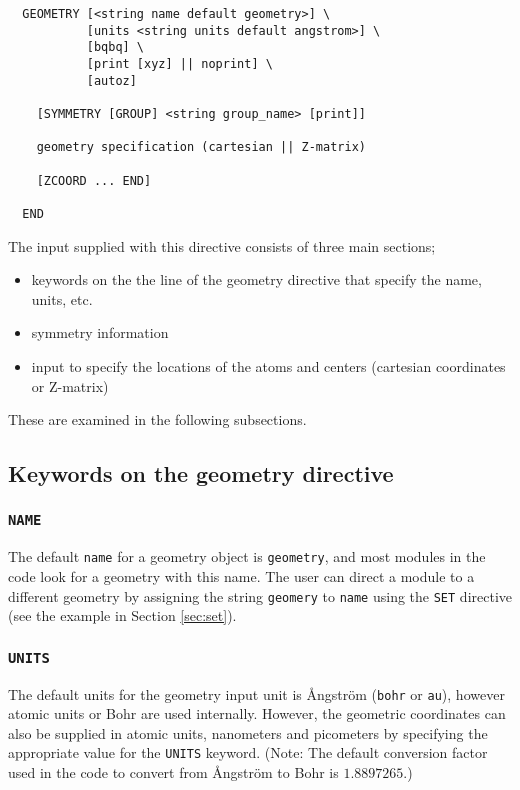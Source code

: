 \label{sec:geom}

\begin{verbatim}
  GEOMETRY [<string name default geometry>] \
           [units <string units default angstrom>] \
           [bqbq] \
           [print [xyz] || noprint] \
           [autoz]
    
    [SYMMETRY [GROUP] <string group_name> [print]]

    geometry specification (cartesian || Z-matrix)

    [ZCOORD ... END]

  END
\end{verbatim}

The input supplied with this directive consists of three main
sections;

\begin{itemize}
\item keywords on the the line of the geometry directive that specify
  the name, units, etc.
\item symmetry information
\item input to specify the locations of the atoms and centers
  (cartesian coordinates or Z-matrix)
\end{itemize}

These are examined in the following subsections.

\subsection{Keywords on the geometry directive}
\subsubsection*{{\tt NAME}}
The default \verb+name+ for a geometry object is \verb+geometry+, and
most modules in the code look for a geometry with this name.  The user
can direct a module to a different geometry by assigning the string
\verb+geomery+ to \verb+name+ using the \verb+SET+ directive (see the
example in Section \ref{sec:set}).

\subsubsection*{{\tt UNITS}}
The default units for the geometry input unit is {\AA}ngstr\"{o}m
(\verb+bohr+ or \verb+au+), however atomic units or Bohr are used
internally.  However, the geometric coordinates can also be supplied
in atomic units, nanometers and picometers by specifying the
appropriate value for the \verb+UNITS+ keyword.  (Note: The default
conversion factor used in the code to convert from {\AA}ngstr\"{o}m to
Bohr is $1.8897265$.)

